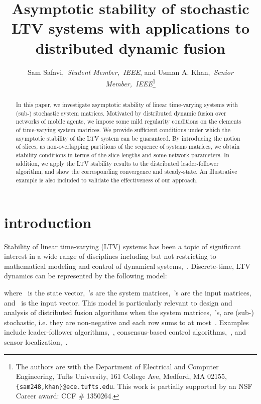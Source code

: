 \documentclass[draftclsnofoot, onecolumn, 12pt]{IEEEtran}
\begin{document}
\title{Asymptotic stability of stochastic LTV systems with applications to distributed dynamic fusion}
\author{Sam Safavi,~\emph{Student Member,~IEEE}, and Usman A. Khan,~\emph{Senior Member,~IEEE}\thanks{The authors are with the Department of Electrical and Computer Engineering, Tufts University, 161 College Ave, Medford, MA 02155, {\texttt{\{sam248,khan\}@ece.tufts.edu}}. This work is partially supported by an NSF Career award: CCF \# 1350264.}}
\maketitle
\thispagestyle{empty}

\begin{abstract}
In this paper, we investigate asymptotic stability of linear time-varying  systems with (sub-) stochastic system matrices. Motivated by distributed dynamic fusion over networks of mobile agents, we impose some mild regularity conditions on the elements of time-varying system matrices. We provide sufficient conditions under which the asymptotic stability of the LTV system can be guaranteed. By introducing the notion of slices, as non-overlapping partitions of the sequence of systems matrices, we obtain stability conditions in terms of the slice lengths and some network parameters. In addition, we apply the LTV stability results to the distributed leader-follower algorithm, and show the corresponding convergence and steady-state. An illustrative example is also included to validate the effectiveness of our approach.
\end{abstract}

\section{introduction}\label{intro}
Stability of linear time-varying (LTV) systems has been a topic of significant interest in a wide range of disciplines including but not restricting to mathematical modeling and control of dynamical systems,~\cite{rosenbrook1963stability,1100529,1084637,Ilchmann1987157,tsakalis1993linear,DaCunha2005381,Phat2006343}. Discrete-time, LTV dynamics can be represented by the following model:

where~ is the state vector,~'s are the system matrices,~'s are the input matrices, and~ is the input vector. This model is particularly relevant to design and analysis of distributed fusion algorithms when the system matrices,~'s, are (sub-) stochastic, i.e. they are non-negative and each row sums to at most~. Examples include leader-follower algorithms,~\cite{tanner02,4200874}, consensus-based control algorithms,~\cite{5509836,5456181,4456762}, and sensor localization,~\cite{khan2009distributed,khan2010diland}. 
\end{document}
